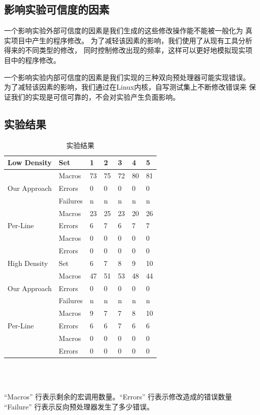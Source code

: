\subsection{影响实验可信度的因素}
一个影响实验外部可信度的因素是我们生成的这些修改操作能不能被一般化为
真实项目中产生的程序修改。
为了减轻该因素的影响，我们使用了从现有工具分析得来的不同类型的修改，
同时控制修改出现的频率，这样可以更好地模拟现实项目中的程序修改。

一个影响实验内部可信度的因素是我们实现的三种双向预处理器可能实现错误。
为了减轻该因素的影响，我们通过在Linux内核，自写测试集上不断修改错误来
保证我们的实现是可信可靠的，不会对实验产生负面影响。

\subsection{实验结果}
\begin{table}[htbp]
  \caption{实验结果}\label{tbl:results}
\centering
\begin{tabular}{|l|l|lllll|}
  \hline
  Low Density & Set & 1 & 2 & 3 & 4 & 5\\
  \hline
  \multirow{3}{*}{Our Approach} &  Macros & 73 & 75 & 72 & 80 & 81 \\
  \cline{2-7}
              &Errors & 0 & 0 & 0 & 0 & 0  \\
  \cline{2-7}
              & Failures & n & n & n & n & n \\
  \hline
  \multirow{3}{*}{Per-Line} & Macros & 23 & 25 & 23 & 20 & 26 \\
  \cline{2-7}
              & Errors & 6 & 7 & 6 & 7 & 7  \\
  \hline
  \multirow{3}{*}{Per-File} & Macros & 0 & 0 & 0 & 0 & 0  \\
  \cline{2-7}
              & Errors & 0 & 0 & 0 & 0 & 0 \\
  \hline
  \hline
  High Density & Set & 6 & 7 & 8& 9& 10\\
  \hline
  \multirow{3}{*}{Our Approach} &Macros & 47 & 51 & 53 & 48 & 44 \\
  \cline{2-7}
              &  Errors & 0 & 0 & 0 & 0 & 0  \\
  \cline{2-7}
              & Failures & n & n & n & n & n \\
  \hline
  \multirow{3}{*}{Per-Line} & Macros & 9 & 7 & 7 & 8 & 10  \\
  \cline{2-7}
              & Errors & 6 & 6 & 7 & 6 & 6 \\
  \hline
  \multirow{3}{*}{Per-File} & Macros & 0 & 0 & 0 & 0 & 0  \\
  \cline{2-7}
              & Errors & 0 & 0 & 0 & 0 & 0 \\
  \hline\end{tabular}
\\
\parbox{\columnwidth}{ \ \\
\footnotesize ``Macros'' 行表示剩余的宏调用数量。``Errors'' 行表示修改造成的错误数量
      ``Failure'' 行表示反向预处理器发生了多少错误。}
\end{table}


